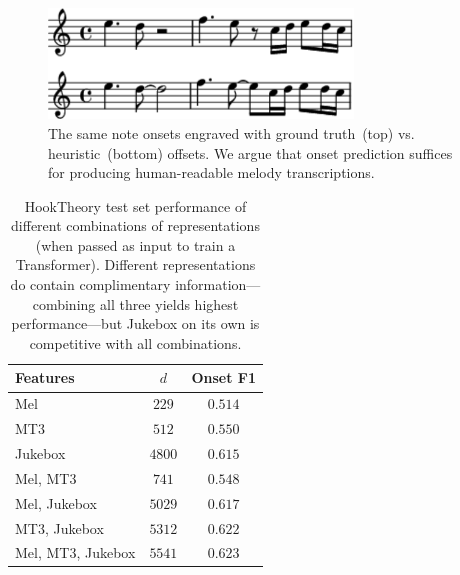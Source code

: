 \documentclass{article}
\newcommand{\mel}{Mel}
\newcommand{\mtthree}{MT3}
\newcommand{\jukebox}{Jukebox}
\newcommand{\hooktheory}{HookTheory}
\begin{document}
\begin{figure}
    \centering
    \includegraphics[width=8.1cm]{figs/heuristic_offsets.pdf}
    \caption{
The same note onsets engraved with ground truth~(top) vs. heuristic~(bottom) offsets. 
We argue that onset prediction suffices for producing human-readable melody transcriptions.
}
 \label{fig:heuristic_offsets}
\end{figure}

\begin{table}[]
    \centering
    \begin{tabular}{lcc}
\toprule
Features & $d$ & Onset F1 \\
\midrule
\mel{} & $229$ & $0.514$ \\
\mtthree{} & $512$ & $0.550$ \\
\jukebox{} & $4800$ & $0.615$ \\
\mel{}, \mtthree{} & $741$ & $0.548$ \\
\mel{}, \jukebox{} & $5029$ & $0.617$ \\
\mtthree{}, \jukebox{} & $5312$ & $0.622$ \\
\mel{}, \mtthree{}, \jukebox{} & $5541$ & $\mathbf{0.623}$ \\
\bottomrule
    \end{tabular}
    \caption{\hooktheory{} test set performance of different combinations of representations (when passed as input to train a Transformer). Different representations do contain complimentary information---combining all three yields highest performance---but Jukebox on its own is competitive with all combinations.}
    \label{tab:hooktheory_test}
\end{table}
\end{document}
